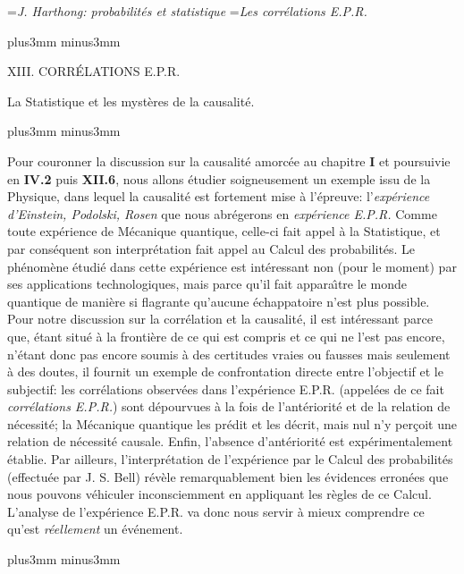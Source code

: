 


\auteurcourant={\sl J. Harthong: probabilit\'es et statistique}
\titrecourant={\sl Les corr\'elations E.P.R.}


\vskip10mm plus3mm minus3mm

\centerline{\tit XIII. CORR\'ELATIONS E.P.R.}
\vskip8pt
\centerline{\tit La Statistique et les myst\`eres de la causalit\'e.}

\vskip10mm plus3mm minus3mm

Pour couronner la discussion sur la causalit\'e amorc\'ee au chapitre 
{\bf I} et poursuivie en {\bf IV.2} puis {\bf XII.6}, nous allons 
\'etudier soigneusement un exemple issu  de la Physique, dans lequel 
la causalit\'e est fortement mise \`a l'\'epreuve: l'{\it exp\'erience 
d'Einstein, Podolski, Rosen} que nous abr\'egerons en {\it exp\'erience 
E.P.R.} Comme toute exp\'erience de M\'ecanique quantique, celle-ci  
fait appel \`a la Statistique, et par cons\'equent son interpr\'etation  
fait appel au Calcul des probabilit\'es. Le ph\'enom\`ene \'etudi\'e  dans 
cette exp\'erience est int\'eressant non (pour  le moment) par ses 
applications technologiques, mais parce qu'il fait  appara\^\i tre le  
monde quantique de mani\`ere si flagrante qu'aucune \'echappatoire  
n'est plus possible. Pour notre discussion sur la corr\'elation et la 
causalit\'e, il est int\'eressant parce  que, \'etant situ\'e \`a la 
fronti\`ere de ce qui est compris et ce qui ne l'est pas encore, n'\'etant 
donc pas encore soumis \`a des certitudes vraies ou fausses mais 
seulement \`a des doutes, il fournit un exemple de confrontation directe 
entre l'objectif et le subjectif: les corr\'elations observ\'ees dans 
l'exp\'erience  E.P.R. (appel\'ees de ce fait {\it corr\'elations E.P.R.}) 
sont d\'epourvues \`a la fois de l'ant\'eriorit\'e et de la relation de 
n\'ecessit\'e; la M\'ecanique  quantique les pr\'edit et les d\'ecrit, mais 
nul n'y per\c{c}oit une relation de n\'ecessit\'e causale. Enfin, 
l'absence d'ant\'eriorit\'e est exp\'erimentalement \'etablie.    
\medskip 
Par ailleurs, l'interpr\'etation de l'exp\'erience par le Calcul des  
probabilit\'es (effectu\'ee par J. S. Bell) r\'ev\`ele remarquablement bien
les \'evidences erron\'ees que nous pouvons v\'ehiculer inconsciemment  
en appliquant les r\`egles de ce Calcul. L'analyse de l'exp\'erience E.P.R.  
va donc nous servir \`a mieux comprendre ce qu'est {\it r\'eellement} un 
\'ev\'enement.  
 
\vskip6mm plus3mm minus3mm 

